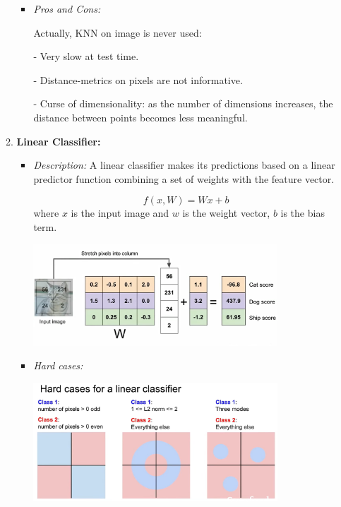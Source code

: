\documentclass{article}
\begin{document}
\begin{CJK}{UTF8}{gbsn}
\begin{enumerate}
\begin{enumerate}
\begin{itemize}
            \item \textit{Pros and Cons:}\par
            Actually, KNN on image is never used:\par
            - Very slow at test time.\par
            - Distance-metrics on pixels are not informative.\par
            - Curse of dimensionality: as the number of dimensions increases, the distance between points becomes less meaningful.\par
        \end{itemize}

        \item \textbf{Linear Classifier:}
        \begin{itemize}
            \item \textit{Description:} A linear classifier makes its predictions based on a linear predictor function combining a set of weights with the feature vector.\par
            \begin{equation}
                f(x, W) = Wx + b
            \end{equation}
            where \(x\) is the input image and \(w\) is the weight vector, \(b\) is the bias term.\par
            \includegraphics[width=0.8\textwidth]{images/Lecture1/linear_classifier_example.png}
            \item \textit{Hard cases:}\par
            \includegraphics[width=0.8\textwidth]{images/Lecture1/hard_cases_for_linear_classifier.png}
        \end{itemize}


    \end{enumerate}
\end{enumerate}

\end{CJK}
\end{document}
